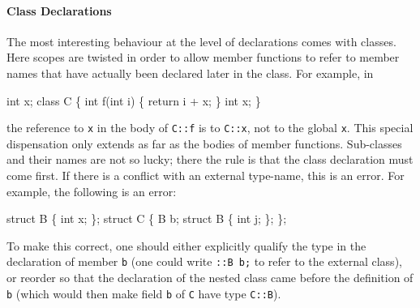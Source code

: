\documentclass[11pt]{article}
\begin{document}
\paragraph{Class Declarations} The most interesting behaviour at the
level of declarations comes with classes.  Here scopes are twisted in
order to allow member functions to refer to member names that have
actually been declared later in the class.  For example, in
\begin{stdrule}
   int x;
   class C \{
     int f(int i) \{ return i + x; \}
     int x;
   \}
\end{stdrule}
the reference to \texttt{x} in the body of \texttt{C::f} is to
\texttt{C::x}, not to the global \texttt{x}.  This special
dispensation only extends as far as the bodies of member functions.
Sub-classes and their names are not so lucky; there the rule is that
the class declaration must come first.  If there is a conflict with an
external type-name, this is an error.  For example, the
following is an error:
\begin{stdrule}
   struct B \{ int x; \};
   struct C \{
     B b;
     struct B \{ int j; \};
   \};
\end{stdrule}
To make this correct, one should either explicitly qualify the type in
the declaration of member \texttt{b} (one could write \texttt{::B~b;}
to refer to the external class), or reorder so that the declaration of
the nested class came before the definition of \texttt{b} (which would
then make field \texttt{b} of \texttt{C} have type \texttt{C::B}).
\end{document}
